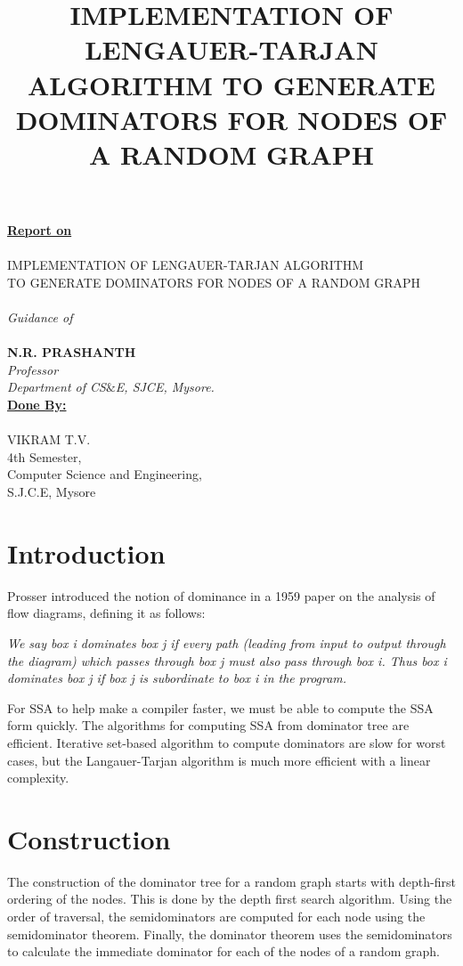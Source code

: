 \documentclass[10pt, oneside, a4paper]{article}
\begin{document}
\begin{center}
\textbf{\underline{Report on}}\\
\textsc{\\IMPLEMENTATION OF LENGAUER-TARJAN ALGORITHM\\ TO GENERATE DOMINATORS FOR NODES OF A RANDOM GRAPH\\}
\emph{\\Guidance of}\\
\textbf{\\N.R. PRASHANTH}\\
\textit{Professor}\\
\textit{Department of CS$\&$E, SJCE, Mysore.}\\
\vspace{1in}
\textbf{\underline{Done By:}}\\
\textsc{\\VIKRAM T.V.}\\
4th Semester,\\ Computer Science and Engineering,\\
S.J.C.E, Mysore\\
\title {IMPLEMENTATION OF LENGAUER-TARJAN ALGORITHM TO GENERATE DOMINATORS FOR NODES OF A RANDOM GRAPH\\}
\end{center}
\newpage
\thispagestyle{empty}
\tableofcontents
\newpage
{}

\twocolumn
\section{Introduction}
Prosser introduced the notion of dominance in a 1959 paper on the analysis of flow diagrams, defining it as follows:

\emph{We say box i dominates box j if every path (leading from input to output through the diagram) which passes through box j must also pass through box i. Thus box i dominates box j if box j is subordinate to box i in the program.}

For SSA to help make a compiler faster, we must be able to compute the SSA form quickly.  The algorithms for computing SSA from dominator tree are efficient.  Iterative set-based algorithm to compute dominators are slow for worst cases, but the Langauer-Tarjan algorithm is much more efficient with a linear complexity.

\section{Construction}
The construction of the dominator tree for a random graph starts with depth-first ordering of the nodes.  This is done by the depth first search algorithm.  Using the order of traversal, the semidominators are computed for each node using the semidominator theorem.  Finally, the dominator theorem uses the semidominators to calculate the immediate dominator for each of the nodes of a random graph.
\end{document}

